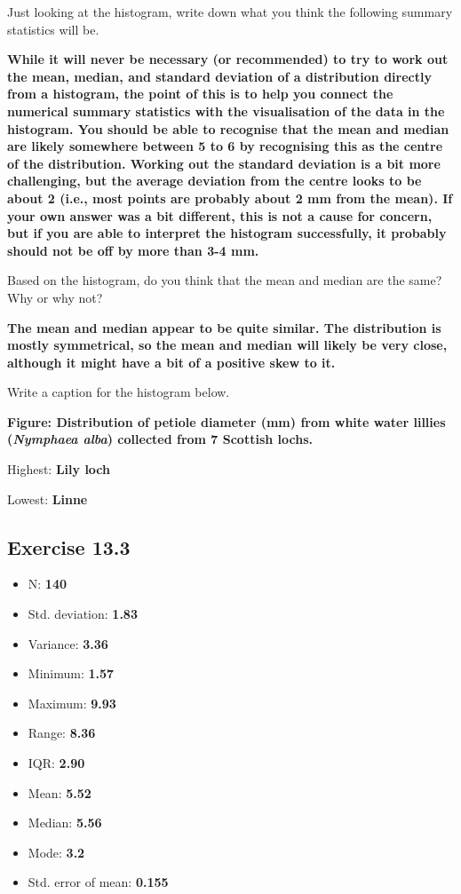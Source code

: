 \documentclass[
  openany]{scrbook}
\providecommand{\tightlist}{%
  \setlength{\itemsep}{0pt}\setlength{\parskip}{0pt}}
\begin{document}
Just looking at the histogram, write down what you think the following summary statistics will be.

\textbf{While it will never be necessary (or recommended) to try to work out the mean, median, and standard deviation of a distribution directly from a histogram, the point of this is to help you connect the numerical summary statistics with the visualisation of the data in the histogram. You should be able to recognise that the mean and median are likely somewhere between 5 to 6 by recognising this as the centre of the distribution. Working out the standard deviation is a bit more challenging, but the average deviation from the centre looks to be about 2 (i.e., most points are probably about 2 mm from the mean). If your own answer was a bit different, this is not a cause for concern, but if you are able to interpret the histogram successfully, it probably should not be off by more than 3-4 mm.}

Based on the histogram, do you think that the mean and median are the same? Why or why
not?

\textbf{The mean and median appear to be quite similar. The distribution is mostly symmetrical, so the mean and median will likely be very close, although it might have a bit of a positive skew to it.}

Write a caption for the histogram below.

\textbf{Figure: Distribution of petiole diameter (mm) from white water lillies (\emph{Nymphaea alba}) collected from 7 Scottish lochs.}

Highest: \textbf{Lily loch}

Lowest: \textbf{Linne}

\hypertarget{exercise-13.3}{%
\subsection{Exercise 13.3}\label{exercise-13.3}}

\begin{itemize}
\tightlist
\item
  N: \textbf{140}
\item
  Std. deviation: \textbf{1.83}
\item
  Variance: \textbf{3.36}
\item
  Minimum: \textbf{1.57}
\item
  Maximum: \textbf{9.93}
\item
  Range: \textbf{8.36}
\item
  IQR: \textbf{2.90}
\item
  Mean: \textbf{5.52}
\item
  Median: \textbf{5.56}
\item
  Mode: \textbf{3.2}
\item
  Std. error of mean: \textbf{0.155}
\end{itemize}
\end{document}
